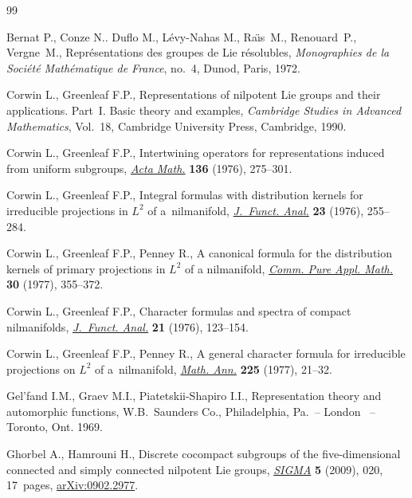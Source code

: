 \documentclass[pdftex]{sigma}
\begin{document}
\begin{thebibliography}{99}

\footnotesize\itemsep=0pt

Bernat P., Conze N.. Duflo M., L\'evy-Nahas M., Ra\"{\i}s~M., Renouard~P., Vergne~M.,
Repr\'esentations des groupes de Lie r\'esolubles,
{\it Monographies de la Soci\'et\'e Math\'ematique de France}, no.~4, Dunod, Paris, 1972.


Corwin L., Greenleaf F.P.,
Representations of nilpotent Lie groups and their applications. Part~I. Basic theory and examples,
{\it Cambridge Studies in Advanced Mathematics}, Vol.~18, Cambridge University Press, Cambridge, 1990.

Corwin L., Greenleaf F.P.,
Intertwining operators for representations induced from uniform subgroups,
\href{http://dx.doi.org/10.1007/BF02392047}{{\it Acta Math.}} \textbf{136} (1976), 275--301.

Corwin L., Greenleaf F.P.,
Integral formulas with distribution kernels for
 irreducible projections in $L^2$ of a~nilmanifold,
\href{http://dx.doi.org/10.1016/0022-1236(76)90051-3}{{\it J.~Funct. Anal.}} \textbf{23} (1976), 255--284.

Corwin L., Greenleaf F.P., Penney R.,
A canonical formula for the distribution kernels of primary projections in $L^2$ of a nilmanifold,
\href{http://dx.doi.org/10.1002/cpa.3160300308}{{\it Comm. Pure Appl. Math.}} \textbf{30} (1977), 355--372.

Corwin L., Greenleaf F.P.,
Character formulas and spectra of compact nilmanifolds,
\href{http://dx.doi.org/10.1016/0022-1236(76)90074-4}{{\it J.~Funct. Anal.}} \textbf{21} (1976), 123--154.

Corwin L., Greenleaf F.P., Penney R.,
A general character formula for irreducible projections on $L^2$ of a~nilmanifold,
\href{http://www.ams.org/leavingmsn?url=http://dx.doi.org/10.1007/BF01364889}{{\it Math. Ann.}} \textbf{225} (1977), 21--32.

Gel'fand I.M., Graev M.I., Piatetskii-Shapiro I.I.,
Representation theory and automorphic functions,
W.B.~Saunders Co., Philadelphia, Pa.~-- London~ -- Toronto, Ont. 1969.

Ghorbel A., Hamrouni H.,
Discrete cocompact subgroups of  the f\/ive-dimensional connected and simply connected nilpotent Lie groups,
\href{http://dx.doi.org/10.3842/SIGMA.2009.020}{{\it SIGMA}} \textbf{5} (2009), 020, 17~pages,
\href{http://arxiv.org/abs/0902.2977}{arXiv:0902.2977}.



\end{thebibliography}
\end{document}
